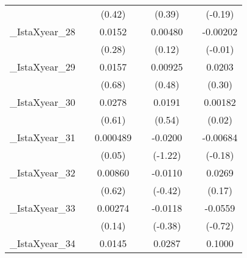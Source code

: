 {\begin{tabular}{l*{6}{c}}
            &                     &      (0.42)         &                     &      (0.39)         &                     &     (-0.19)         \\
[1em]
\_IstaXyear\_28&                     &      0.0152         &                     &     0.00480         &                     &    -0.00202         \\
            &                     &      (0.28)         &                     &      (0.12)         &                     &     (-0.01)         \\
[1em]
\_IstaXyear\_29&                     &      0.0157         &                     &     0.00925         &                     &      0.0203         \\
            &                     &      (0.68)         &                     &      (0.48)         &                     &      (0.30)         \\
[1em]
\_IstaXyear\_30&                     &      0.0278         &                     &      0.0191         &                     &     0.00182         \\
            &                     &      (0.61)         &                     &      (0.54)         &                     &      (0.02)         \\
[1em]
\_IstaXyear\_31&                     &    0.000489         &                     &     -0.0200         &                     &    -0.00684         \\
            &                     &      (0.05)         &                     &     (-1.22)         &                     &     (-0.18)         \\
[1em]
\_IstaXyear\_32&                     &     0.00860         &                     &     -0.0110         &                     &      0.0269         \\
            &                     &      (0.62)         &                     &     (-0.42)         &                     &      (0.17)         \\
[1em]
\_IstaXyear\_33&                     &     0.00274         &                     &     -0.0118         &                     &     -0.0559         \\
            &                     &      (0.14)         &                     &     (-0.38)         &                     &     (-0.72)         \\
[1em]
\_IstaXyear\_34&                     &      0.0145         &                     &      0.0287         &                     &      0.1000         \\

\end{tabular}}
